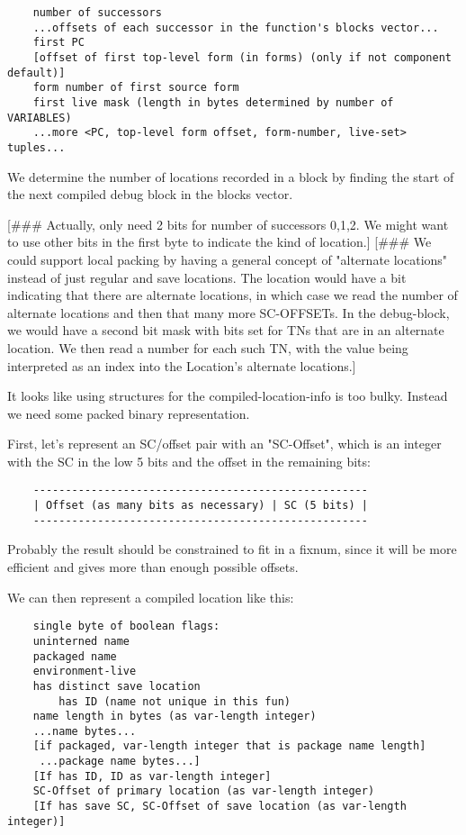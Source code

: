 \begin{verbatim}
    number of successors
    ...offsets of each successor in the function's blocks vector...
    first PC
    [offset of first top-level form (in forms) (only if not component default)]
    form number of first source form
    first live mask (length in bytes determined by number of VARIABLES)
    ...more <PC, top-level form offset, form-number, live-set> tuples...
\end{verbatim}

We determine the number of locations recorded in a block by finding the
start of the next compiled debug block in the blocks vector.

[\#\#\# Actually, only need 2 bits for number of successors {0,1,2}.  We might
want to use other bits in the first byte to indicate the kind of location.]
[\#\#\# We could support local packing by having a general concept of "alternate
locations" instead of just regular and save locations.  The location would have
a bit indicating that there are alternate locations, in which case we read the
number of alternate locations and then that many more SC-OFFSETs.  In the
debug-block, we would have a second bit mask with bits set for TNs that are in
an alternate location.  We then read a number for each such TN, with the value
being interpreted as an index into the Location's alternate locations.]



It looks like using structures for the compiled-location-info is too bulky.
Instead we need some packed binary representation.

First, let's represent an SC/offset pair with an "SC-Offset", which is an
integer with the SC in the low 5 bits and the offset in the remaining bits:
\begin{verbatim}
    ----------------------------------------------------
    | Offset (as many bits as necessary) | SC (5 bits) |
    ----------------------------------------------------
\end{verbatim}
Probably the result should be constrained to fit in a fixnum, since it will be
more efficient and gives more than enough possible offsets.

We can then represent a compiled location like this:
\begin{verbatim}
    single byte of boolean flags:
	uninterned name
	packaged name
	environment-live
	has distinct save location
        has ID (name not unique in this fun)
    name length in bytes (as var-length integer)
    ...name bytes...
    [if packaged, var-length integer that is package name length]
     ...package name bytes...]
    [If has ID, ID as var-length integer]
    SC-Offset of primary location (as var-length integer)
    [If has save SC, SC-Offset of save location (as var-length integer)]
\end{verbatim}


